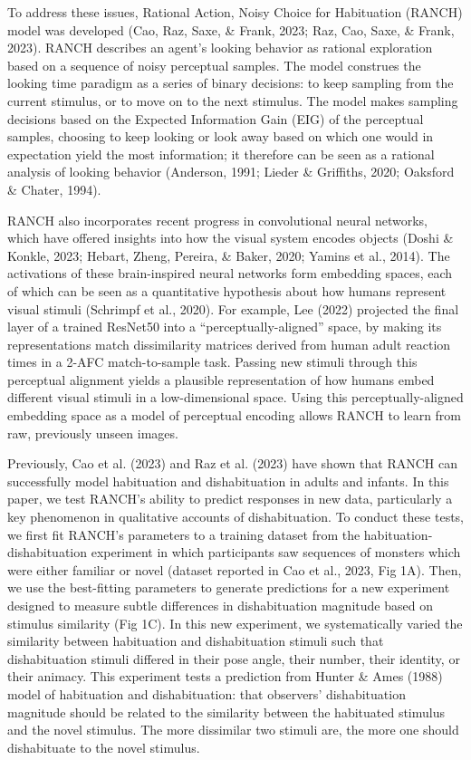 \documentclass[10pt, letterpaper]{article}
\begin{document}
To address these issues, Rational Action, Noisy Choice for Habituation
(RANCH) model was developed (Cao, Raz, Saxe, \& Frank, 2023; Raz, Cao,
Saxe, \& Frank, 2023). RANCH describes an agent's looking behavior as
rational exploration based on a sequence of noisy perceptual samples.
The model construes the looking time paradigm as a series of binary
decisions: to keep sampling from the current stimulus, or to move on to
the next stimulus. The model makes sampling decisions based on the
Expected Information Gain (EIG) of the perceptual samples, choosing to
keep looking or look away based on which one would in expectation yield
the most information; it therefore can be seen as a rational analysis of
looking behavior (Anderson, 1991; Lieder \& Griffiths, 2020; Oaksford \&
Chater, 1994).

RANCH also incorporates recent progress in convolutional neural
networks, which have offered insights into how the visual system encodes
objects (Doshi \& Konkle, 2023; Hebart, Zheng, Pereira, \& Baker, 2020;
Yamins et al., 2014). The activations of these brain-inspired neural
networks form embedding spaces, each of which can be seen as a
quantitative hypothesis about how humans represent visual stimuli
(Schrimpf et al., 2020). For example, Lee (2022) projected the final
layer of a trained ResNet50 into a ``perceptually-aligned'' space, by
making its representations match dissimilarity matrices derived from
human adult reaction times in a 2-AFC match-to-sample task. Passing new
stimuli through this perceptual alignment yields a plausible
representation of how humans embed different visual stimuli in a
low-dimensional space. Using this perceptually-aligned embedding space
as a model of perceptual encoding allows RANCH to learn from raw,
previously unseen images.

Previously, Cao et al. (2023) and Raz et al. (2023) have shown that
RANCH can successfully model habituation and dishabituation in adults
and infants. In this paper, we test RANCH's ability to predict responses
in new data, particularly a key phenomenon in qualitative accounts of
dishabituation. To conduct these tests, we first fit RANCH's parameters
to a training dataset from the habituation-dishabituation experiment in
which participants saw sequences of monsters which were either familiar
or novel (dataset reported in Cao et al., 2023, Fig 1A). Then, we use
the best-fitting parameters to generate predictions for a new experiment
designed to measure subtle differences in dishabituation magnitude based
on stimulus similarity (Fig 1C). In this new experiment, we
systematically varied the similarity between habituation and
dishabituation stimuli such that dishabituation stimuli differed in
their pose angle, their number, their identity, or their animacy. This
experiment tests a prediction from Hunter \& Ames (1988) model of
habituation and dishabituation: that observers' dishabituation magnitude
should be related to the similarity between the habituated stimulus and
the novel stimulus. The more dissimilar two stimuli are, the more one
should dishabituate to the novel stimulus.
\end{document}

